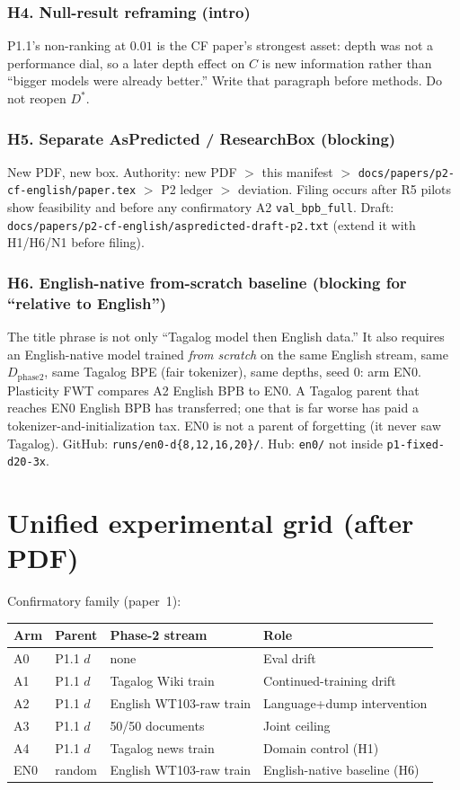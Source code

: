 \documentclass[11pt,a4paper]{article}
\begin{document}
\subsubsection*{H4. Null-result reframing (intro)}
P1.1's non-ranking at $0.01$ is the CF paper's strongest asset: depth was not a performance dial, so a later depth effect on $C$ is new information rather than ``bigger models were already better.'' Write that paragraph before methods. Do not reopen $D^{\ast}$.

\subsubsection*{H5. Separate AsPredicted / ResearchBox (blocking)}
New PDF, new box. Authority: new PDF $>$ this manifest $>$ \texttt{docs/papers/p2-cf-english/paper.tex} $>$ P2 ledger $>$ deviation. Filing occurs after R5 pilots show feasibility and before any confirmatory A2 \texttt{val\_bpb\_full}. Draft: \texttt{docs/papers/p2-cf-english/aspredicted-draft-p2.txt} (extend it with H1/H6/N1 before filing).

\subsubsection*{H6. English-native from-scratch baseline (blocking for ``relative to English'')}
The title phrase is not only ``Tagalog model then English data.'' It also requires an English-native model trained \emph{from scratch} on the same English stream, same $D_{\mathrm{phase2}}$, same Tagalog BPE (fair tokenizer), same depths, seed 0: arm EN0. Plasticity FWT compares A2 English BPB to EN0. A Tagalog parent that reaches EN0 English BPB has transferred; one that is far worse has paid a tokenizer-and-initialization tax. EN0 is not a parent of forgetting (it never saw Tagalog). GitHub: \texttt{runs/en0-d\{8,12,16,20\}/}. Hub: \texttt{en0/} not inside \texttt{p1-fixed-d20-3x}.

\section{Unified experimental grid (after PDF)}
\label{sec:grid}

Confirmatory family (paper~1):

\begin{center}
\small
\begin{tabular}{lllp{6.2cm}}
\toprule
Arm & Parent & Phase-2 stream & Role \\
\midrule
A0 & P1.1 $d$ & none & Eval drift \\
A1 & P1.1 $d$ & Tagalog Wiki train & Continued-training drift \\
A2 & P1.1 $d$ & English WT103-raw train & Language+dump intervention \\
A3 & P1.1 $d$ & 50/50 documents & Joint ceiling \\
A4 & P1.1 $d$ & Tagalog news train & Domain control (H1) \\
EN0 & random & English WT103-raw train & English-native baseline (H6) \\
\bottomrule
\end{tabular}
\end{center}
\end{document}
